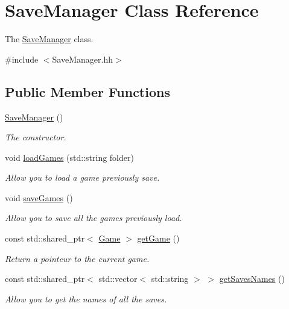 \hypertarget{classSaveManager}{}\section{Save\+Manager Class Reference}
\label{classSaveManager}


The \hyperlink{classSaveManager}{Save\+Manager} class.  




{\ttfamily \#include $<$Save\+Manager.\+hh$>$}

\subsection*{Public Member Functions}
\begin{DoxyCompactItemize}
\item 
\mbox{\label{classSaveManager_ab8bb791be648b9b91db44aa11f6e8e14}} 
\hyperlink{classSaveManager_ab8bb791be648b9b91db44aa11f6e8e14}{Save\+Manager} ()
\begin{DoxyCompactList}\small\item\em The constructor. \end{DoxyCompactList}\item 
void \hyperlink{classSaveManager_a96c17debbf9765e8c71e74010621585f}{load\+Games} (std\+::string folder)
\begin{DoxyCompactList}\small\item\em Allow you to load a game previously save. \end{DoxyCompactList}\item 
\mbox{\label{classSaveManager_a43beb7dd453f37de97c3a8de3b1142ab}} 
void \hyperlink{classSaveManager_a43beb7dd453f37de97c3a8de3b1142ab}{save\+Games} ()
\begin{DoxyCompactList}\small\item\em Allow you to save all the games previously load. \end{DoxyCompactList}\item 
\mbox{\label{classSaveManager_a7b950ce71223640fe56e8d404fe3cd2f}} 
const std\+::shared\+\_\+ptr$<$ \hyperlink{classGame}{Game} $>$ \hyperlink{classSaveManager_a7b950ce71223640fe56e8d404fe3cd2f}{get\+Game} ()
\begin{DoxyCompactList}\small\item\em Return a pointeur to the current game. \end{DoxyCompactList}\item 
const std\+::shared\+\_\+ptr$<$ std\+::vector$<$ std\+::string $>$ $>$ \hyperlink{classSaveManager_a335611df31b6a1eccb5c7df73bc2e778}{get\+Saves\+Names} ()
\begin{DoxyCompactList}\small\item\em Allow you to get the names of all the saves. \end{DoxyCompactList}\end{DoxyCompactItemize}


